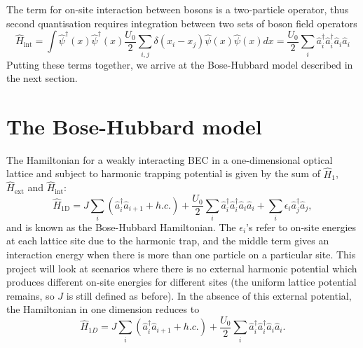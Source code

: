 \documentclass[a4paper, 10pt]{article}
\theoremstyle{plain}
\begin{document}
The term for on-site interaction between bosons is a two-particle operator, thus
second quantisation requires integration between two sets of boson field
operators
\begin{equation}
    \hat{H}_{\text{int}} =
    \int{\hat{\psi}^{\dagger}(x) \hat{\psi}^{\dagger}(x)
          \frac{U_{0}}{2} \sum_{i,j}{\delta(x_{i}-x_{j})}
          \hat{\psi}(x) \hat{\psi}(x) dx
        }
    =
    \frac{U_{0}}{2}
    \sum_{i}
        {\hat{a}_{i}^{\dagger} \hat{a}_{i}^{\dagger} \hat{a}_{i} \hat{a}_{i}}
\end{equation}
Putting these terms together, we arrive at the Bose-Hubbard model described in
the next section.


\section{The Bose-Hubbard model}

The Hamiltonian for a weakly interacting BEC in a one-dimensional optical
lattice and subject to harmonic trapping potential is given by the sum of
$\hat{H}_{1}$, $\hat{H}_{\text{ext}}$ and $\hat{H}_{\text{int}}$:
\begin{equation}
    \hat{H}_{\text{1D}}
    =
    J \sum_{i}{(\hat{a}^\dagger_{i}\hat{a}_{i+1} + h.c.)} +
    \frac{U_{0}}{2}
    \sum_{i}%
        {\hat{a}_{i}^{\dagger} \hat{a}_{i}^{\dagger} \hat{a}_{i} \hat{a}_{i}} +
    \sum_{i}%
        {\epsilon_{i} \hat{a}_{j}^{\dagger} \hat{a}_{j}},
\end{equation}
and is known as the Bose-Hubbard Hamiltonian. The $\epsilon_{i}$'s refer to
on-site energies at each lattice site due to the harmonic trap, and the middle
term gives an interaction energy when there is more than one particle on a
particular site. This project will look at scenarios where there is no external
harmonic potential which produces different on-site energies for different sites
(the uniform lattice potential remains, so $J$ is still defined as before). In
the absence of this external potential, the Hamiltonian in one dimension reduces
to
\begin{equation*}
    \hat{H}_{1D}
    =
    J \sum_{i}{(\hat{a}^\dagger_{i}\hat{a}_{i+1}+h.c.)} +
    \frac{U_{0}}{2}
    \sum_{i}{\hat{a}^\dagger_{i} \hat{a}^\dagger_{i} \hat{a}_{i}\hat{a}_{i}}.
\end{equation*}
\end{document}
